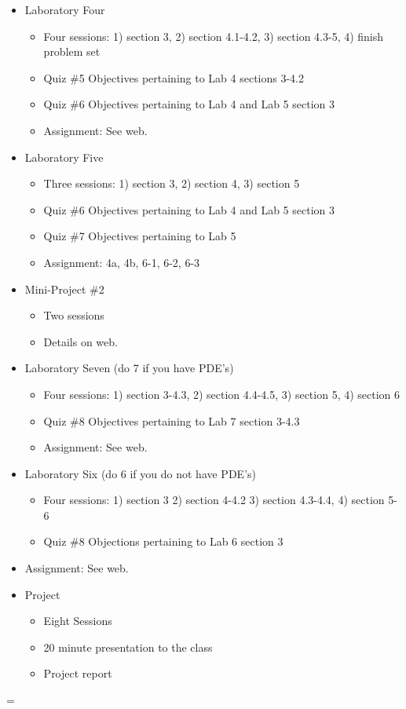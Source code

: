 \documentclass[10pt]{article}
\newenvironment{absolutelynopagebreak}
  {\par\nobreak\vfil\penalty0\vfilneg
   \vtop\bgroup}
  {\par\xdef\tpd{\the\prevdepth}\egroup
   \prevdepth=\tpd}
\begin{document}
\begin{itemize}
\begin{itemize}
\end{itemize}
\item Laboratory Four
\begin{itemize}
\item Four sessions: 1) section 3, 2) section 4.1-4.2, 3) section 4.3-5, 4) finish problem set
\item Quiz \#5 Objectives pertaining to Lab 4 sections 3-4.2
\item Quiz \#6 Objectives pertaining to Lab 4 and Lab 5 section 3
\item Assignment: See web.
\end{itemize}
\item Laboratory Five
\begin{itemize}
\item Three sessions: 1) section 3, 2) section 4, 3) section 5
\item Quiz \#6 Objectives pertaining to Lab 4 and Lab 5 section 3
\item Quiz \#7 Objectives pertaining to Lab 5
\item Assignment: 4a, 4b, 6-1, 6-2, 6-3
\end{itemize}
\item Mini-Project \#2
\begin{itemize}
\item Two sessions
\item Details on web.
\end{itemize}
\item Laboratory Seven (do 7 if you have PDE's)
\begin{itemize}
\item Four sessions: 1) section 3-4.3, 2) section 4.4-4.5, 3) section 5, 4) section 6
\item Quiz \#8 Objectives pertaining to Lab 7 section 3-4.3
\item Assignment: See web.
\end{itemize}
\item Laboratory Six (do 6 if you do not have PDE's)
\begin{itemize}
\item Four sessions: 1) section 3 2) section 4-4.2 3) section 4.3-4.4, 4) section 5-6
\item Quiz \#8 Objections pertaining to Lab 6 section 3
\end{itemize}
\item Assignment: See web.
\end{itemize}
\clearpage
\begin{absolutelynopagebreak}
\begin{itemize}
\item Project
\begin{itemize}
\item Eight Sessions
\item 20 minute presentation to the class
\item Project report
\end{itemize}
\end{itemize}


\end{absolutelynopagebreak}
\end{document}

